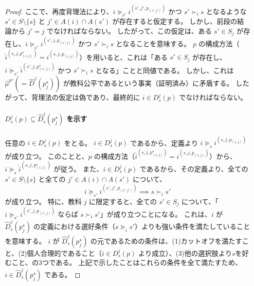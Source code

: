 \documentclass[12pt, a4paper]{article}
\theoremstyle{definition}
\theoremstyle{remark}
\theoremstyle{plain}
\begin{document}
\begin{proof}
ここで、再度背理法により、$i \succeq_{s'} i^{(s',j',p_{(s',j')})}$ かつ $s' \succ_i s$ となるような $s' \in S\setminus \{s\}$ と $j' \in A(i) \cap A(s')$ が存在すると仮定する。
しかし、前段の結論から $j' = j$ でなければならない。
したがって、この仮定は、ある $s' \in S_j$ が存在し、$i \succeq_{s'} i^{(s',j,p_{(s',j)})}$ かつ $s' \succ_i s$ となることを意味する。
$p$ の構成方法（$\widehat{i}^{(s,j,p^\star_{(s,j)})} = i^{(s,j,p_{(s,j)})}$）を用いると、これは「ある $s' \in S_j$ が存在し、$i \succeq_{s'} \widehat{i}^{(s',j,p^\star_{(s',j)})}$ かつ $s' \succ_i s$ となる」ことと同値である。
しかし、これは $\widehat{\mu}^{p^\star} (= \widehat{D}^j(p_j^\star))$ が教科公平であるという事実（証明済み）に矛盾する。
したがって、背理法の仮定は偽であり、最終的に $i \in D_s^j(p)$ でなければならない。



\paragraph{\(D_s^j(p) \subseteq \widehat{D}_s^j(p^\star_j)\) を示す}
任意の \(i \in D_s^j(p)\) をとる。
\(i \in D_s^j(p)\) であるから、定義より $i \succeq_s i^{(s,j,p_{(s,j)})}$ が成り立つ。
このことと、$p$ の構成方法（$\widehat{i}^{(s,j,p^\star_{(s,j)})} = i^{(s,j,p_{(s,j)})}$）から、$i \succeq_s \widehat{i}^{(s,j,p^\star_{(s,j)})}$ が従う。
また、$i \in D_s^j(p)$ であるから、その定義より、全ての $s' \in S\setminus \{s\}$ と全ての $j' \in A(i) \cap A(s')$ について、
\[
 i \succeq_{s'} i^{(s',j',p_{(s',j')})} \implies s \succ_i s'
\]
が成り立つ。
特に、教科 $j$ に限定すると、全ての $s' \in S_j$ について、「$i \succeq_{s'} i^{(s',j,p_{(s',j)})}$ ならば $s \succ_i s'$」が成り立つことになる。
これは、$i$ が $\widehat{D}_s^j(p^\star_j)$ の定義における選好条件（$s \succeq_i s'$）よりも強い条件を満たしていることを意味する。
$i$ が $\widehat{D}_s^j(p_j^\star)$ の元であるための条件は、(1)カットオフを満たすこと、(2)個人合理的であること（$i \in D_s^j(p)$ より成立）、(3)他の選択肢より$s$を好むこと、の3つである。
上記で示したことはこれらの条件を全て満たすため、$i \in \widehat{D}_s^j(p_j^\star)$ である。





\end{proof}
\end{document}
